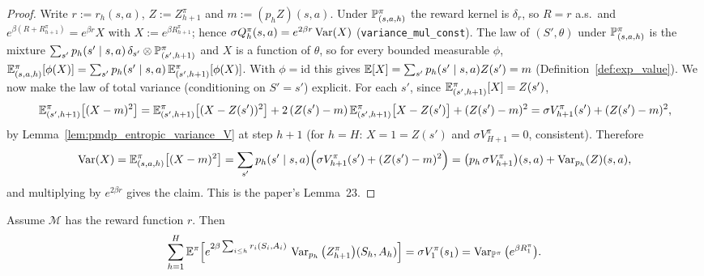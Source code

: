 \begin{proof}
\leanok
Write $r := r_h(s,a)$, $Z := Z^\pi_{h+1}$ and $m := (p_h Z)(s,a)$. Under $\mathbb{P}^\pi_{(s,a,h)}$ the
reward kernel is $\delta_{r}$, so $R = r$ a.s.\ and $e^{\beta(R + R^\pi_{h+1})} = e^{\beta r}X$ with
$X := e^{\beta R^\pi_{h+1}}$; hence $\sigma Q^\pi_h(s,a) = e^{2\beta r}\operatorname{Var}(X)$
(\texttt{variance\_mul\_const}). The law of $(S', \theta)$ under $\mathbb{P}^\pi_{(s,a,h)}$ is the
mixture $\sum_{s'} p_h(s' \mid s,a)\,\delta_{s'} \otimes \mathbb{P}^\pi_{(s',h+1)}$ and $X$ is a
function of $\theta$, so for every bounded measurable $\phi$,
$\mathbb{E}^\pi_{(s,a,h)}[\phi(X)] = \sum_{s'} p_h(s' \mid s,a)\,\mathbb{E}^\pi_{(s',h+1)}[\phi(X)]$. With
$\phi = \mathrm{id}$ this gives $\mathbb{E}[X] = \sum_{s'} p_h(s'\mid s,a) Z(s') = m$
(Definition~\ref{def:exp_value}). We now make the law of total variance (conditioning on
$S' = s'$) explicit. For each $s'$, since $\mathbb{E}^\pi_{(s',h+1)}[X] = Z(s')$,
\[
  \mathbb{E}^\pi_{(s',h+1)}\big[(X - m)^2\big]
  = \mathbb{E}^\pi_{(s',h+1)}\big[(X - Z(s'))^2\big] + 2\,(Z(s') - m)\,\mathbb{E}^\pi_{(s',h+1)}\big[X - Z(s')\big] + (Z(s') - m)^2
  = \sigma V^\pi_{h+1}(s') + (Z(s') - m)^2 ,
\]
by Lemma~\ref{lem:pmdp_entropic_variance_V} at step $h + 1$ (for $h = H$: $X = 1 = Z(s')$ and
$\sigma V^\pi_{H+1} = 0$, consistent). Therefore
\[
  \operatorname{Var}(X) = \mathbb{E}^\pi_{(s,a,h)}\big[(X - m)^2\big]
  = \sum_{s'} p_h(s' \mid s,a)\Big(\sigma V^\pi_{h+1}(s') + (Z(s') - m)^2\Big)
  = \big(p_h\,\sigma V^\pi_{h+1}\big)(s,a) + \operatorname{Var}_{p_h}(Z)(s,a) ,
\]
and multiplying by $e^{2\beta r}$ gives the claim. This is the paper's Lemma~23.
\end{proof}

\begin{lemma}\label{lem:entropic_variance_sum}
\leanok
{}
Assume $\mathcal M$ has the reward function $r$. Then
\[
  \sum_{h=1}^{H}\mathbb{E}^\pi\Big[e^{2\beta\sum_{i \le h} r_i(S_i, A_i)}\,\operatorname{Var}_{p_h}\big(Z^\pi_{h+1}\big)(S_h, A_h)\Big]
  = \sigma V^\pi_1(s_1) = \operatorname{Var}_{\mathbb{P}^\pi}\big(e^{\beta R^\pi_1}\big) .
\]
\end{lemma}

